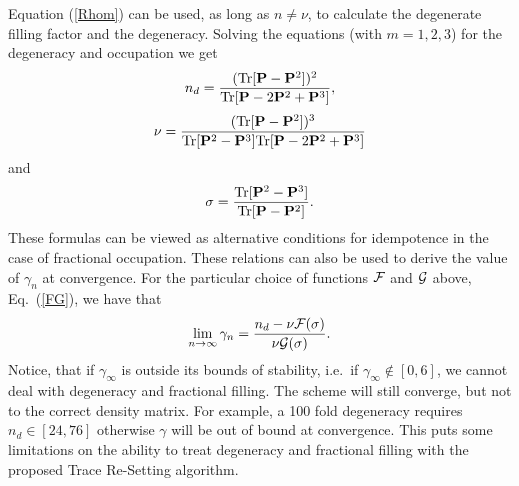 \commentoutA{\documentclass[prb,aps,twocolumn,showpacs,twocolumngrid,superbib]{revtex4}}
\begin{document}
Equation (\ref{Rhom}) can be used, as long as
$n \neq \nu$, to calculate the degenerate filling factor and the degeneracy.
Solving the equations (with $m=1,2,3$) for the degeneracy and occupation we get
\begin{equation}
n_d = \frac{({\rm Tr} [{\bf P}-{\bf P}^2 ])^2}{{\rm Tr} [{\bf P}-2{\bf P}^2+{\bf P}^3 ]},
\end{equation}
\begin{equation}
\nu = \frac{({\rm Tr} [{\bf P}-{\bf P}^2 ])^3}{{\rm Tr} [{\bf P}^2-{\bf P}^3 ]
{\rm Tr} [{\bf P}-2{\bf P}^2+{\bf P}^3 ]}
\end{equation}
and
\begin{equation}
\sigma = \frac{{\rm Tr} [{\bf P}^2-{\bf P}^3 ]}{{\rm Tr} [{\bf P}-{\bf P}^2 ]}.
\end{equation}
These formulas can be viewed as alternative conditions for idempotence
in the case of fractional occupation.  These relations can also be used
to derive the value of $\gamma_n$ at convergence. For the particular
choice of functions $\cal F$ and $\cal G$ above, Eq.\ (\ref{FG}), we have that
\begin{equation}
\lim_{n \rightarrow \infty} \gamma_n = \frac{n_d - \nu {\cal F}(\sigma )}
                                               {\nu {\cal G}(\sigma )}.
\end{equation}
Notice, that if $\gamma_{\infty}$
is outside its bounds of stability, i.e.\ if $\gamma_{\infty} \notin [0,6]$, we cannot deal with
degeneracy and fractional filling. The scheme will still
converge, but not to the correct density matrix. For example,
a 100 fold degeneracy requires $n_d \in [24,76]$ otherwise
$\gamma$ will be out of bound at convergence. This puts some
limitations on the ability to treat degeneracy and fractional filling
with the proposed Trace Re-Setting algorithm.
\end{document}
